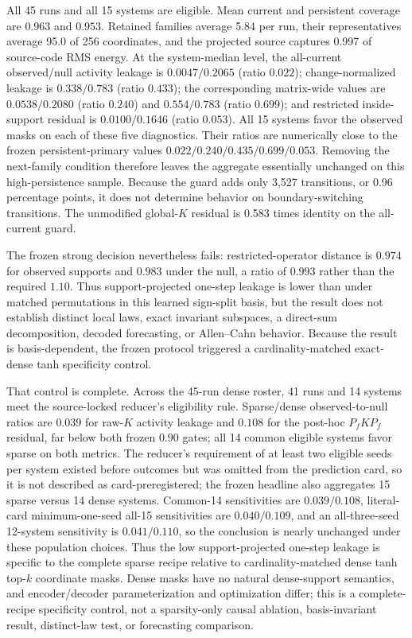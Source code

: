 All 45 runs and all 15 systems are eligible. Mean current and persistent
coverage are \(0.963\) and \(0.953\). Retained families average 5.84 per run,
their representatives average 95.0 of 256 coordinates, and the projected
source captures 0.997 of source-code RMS energy. At the system-median level,
the all-current observed/null activity leakage is \(0.0047/0.2065\) (ratio
\(0.022\)); change-normalized leakage is \(0.338/0.783\) (ratio \(0.433\));
the corresponding matrix-wide values are \(0.0538/0.2080\) (ratio \(0.240\))
and \(0.554/0.783\) (ratio \(0.699\)); and restricted inside-support residual
is \(0.0100/0.1646\) (ratio \(0.053\)). All 15 systems favor the observed masks
on each of these five diagnostics. Their ratios are numerically close to the
frozen persistent-primary values \(0.022/0.240/0.435/0.699/0.053\). Removing
the next-family condition therefore leaves the aggregate essentially
unchanged on this high-persistence sample. Because the guard adds only 3,527
transitions, or 0.96 percentage points, it does not determine behavior on
boundary-switching transitions. The unmodified
global-\(K\) residual is 0.583 times identity on the all-current guard.

The frozen strong decision nevertheless fails: restricted-operator distance
is \(0.974\) for observed supports and \(0.983\) under the null, a ratio of
\(0.993\) rather than the required \(1.10\). Thus support-projected one-step
leakage is lower than under matched permutations in this learned sign-split
basis, but the result does not establish distinct local laws, exact invariant subspaces, a direct-sum
decomposition, decoded forecasting, or Allen--Cahn behavior. Because the
result is basis-dependent, the frozen protocol triggered a
cardinality-matched exact-dense tanh specificity control.

That control is complete. Across the 45-run dense roster, 41 runs and 14
systems meet the source-locked reducer's eligibility rule. Sparse/dense
observed-to-null ratios are $0.039$ for raw-$K$ activity leakage and
$0.108$ for the post-hoc $P_fKP_f$ residual, far below both frozen $0.90$
gates; all 14 common eligible systems favor sparse on both metrics. The
reducer's requirement of at least two eligible seeds per system existed before
outcomes but was omitted from the prediction card, so it is not described as
card-preregistered; the frozen headline also aggregates 15 sparse versus 14
dense systems. Common-14 sensitivities are $0.039/0.108$, literal-card
minimum-one-seed all-15 sensitivities are $0.040/0.109$, and an all-three-seed
12-system sensitivity is $0.041/0.110$, so the conclusion is nearly unchanged
under these population choices. Thus the low support-projected one-step leakage
is specific to the complete sparse recipe relative to cardinality-matched
dense tanh top-$k$ coordinate masks. Dense masks have no natural dense-support semantics, and
encoder/decoder parameterization and optimization differ; this is a
complete-recipe specificity control, not a sparsity-only causal ablation,
basis-invariant result, distinct-law test, or forecasting comparison.

